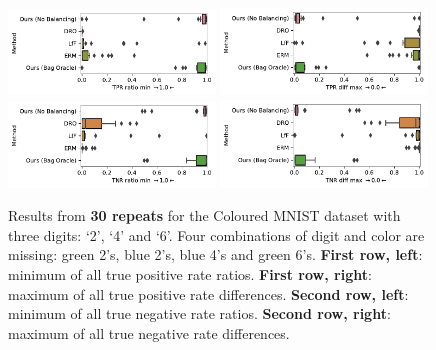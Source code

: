 \begin{figure}[htp]
  \centering
  \includegraphics[width=0.49\textwidth]{supmatch/figures/cmnist/supmat/cmnist_3dig_4miss_tprr-min.pdf}
  \includegraphics[width=0.49\textwidth]{supmatch/figures/cmnist/supmat/cmnist_3dig_4miss_tprd-max.pdf}
  \includegraphics[width=0.49\textwidth]{supmatch/figures/cmnist/supmat/cmnist_3dig_4miss_tnrr-min.pdf}
  \includegraphics[width=0.49\textwidth]{supmatch/figures/cmnist/supmat/cmnist_3dig_4miss_tnrd-max.pdf}
  \caption{
    Results from \textbf{30 repeats} for the Coloured MNIST dataset with three digits: `2', `4' and
    `6'. Four combinations of digit and color are missing: {\color{green}green} 2's,
    {\color{blue}blue} 2's, {\color{blue}blue} 4's and {\color{green}green} 6's.
    \textbf{First row, left}: minimum of all true positive rate ratios.
    \textbf{First row, right}: maximum of all true positive rate differences.
    \textbf{Second row, left}: minimum of all true negative rate ratios.
    \textbf{Second row, right}: maximum of all true negative rate differences.
  }%
  \label{fig:cmnist-3dig-4miss-add}
\end{figure}
  
